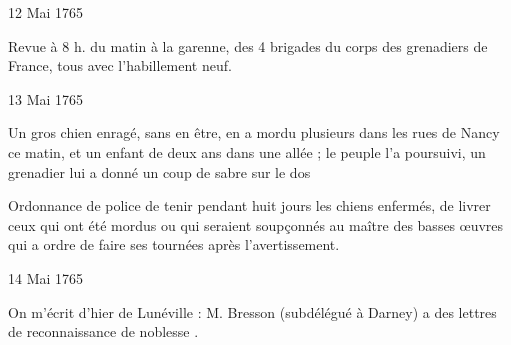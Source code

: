                      \begin{diary}{12 Mai 1765}{}

                         Revue à 8 h. du matin à
                              la garenne, des
                           4 brigades du corps des grenadiers de France,
                           tous avec l'habillement neuf. \bigskip


                     \end{diary}
                     \begin{diary}{13 Mai 1765}{}

                         Un gros chien enragé, sans en être, en
                           a mordu
                           plusieurs dans les rues de
                              Nancy ce matin,
                           et un enfant de deux ans dans une allée ;
                           le peuple l'a poursuivi, un grenadier lui a
                           donné un coup de sabre sur le dos \bigskip


                         Ordonnance de police de tenir pendant
                           huit
                           jours les chiens enfermés, de livrer ceux qui
                           ont été mordus ou qui seraient soupçonnés au
                           maître des basses
                              œuvres qui a ordre de
                           faire
                           ses tournées après l'avertissement. \bigskip


                     \end{diary}
                     \begin{diary}{14 Mai 1765}{}

                         On m'écrit d'hier de Lunéville : \og M. Bresson (subdélégué
                              à Darney) a des lettres de
                              reconnaissance de noblesse \fg{}. \bigskip


                     \end{diary}


